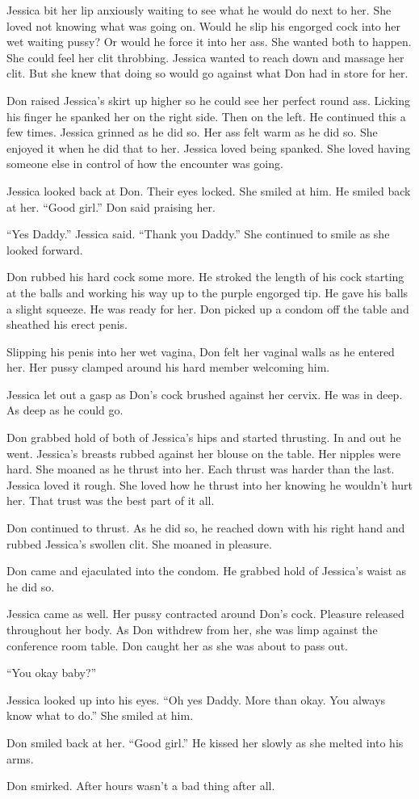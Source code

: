 Jessica bit her lip anxiously waiting to see what he would do next to her. She loved not knowing what was going on. Would he slip his engorged cock into her wet waiting pussy? Or would he force it into her ass. She wanted both to happen. She could feel her clit throbbing. Jessica wanted to reach down and massage her clit. But she knew that doing so would go against what Don had in store for her.

Don raised Jessica’s skirt up higher so he could see her perfect round ass. Licking his finger he spanked her on the right side. Then on the left. He continued this a few times. Jessica grinned as he did so. Her ass felt warm as he did so. She enjoyed it when he did that to her. Jessica loved being spanked. She loved having someone else in control of how the encounter was going.

Jessica looked back at Don. Their eyes locked. She smiled at him. He smiled back at her. “Good girl.” Don said praising her.

“Yes Daddy.” Jessica said. “Thank you Daddy.” She continued to smile as she looked forward.

Don rubbed his hard cock some more. He stroked the length of his cock starting at the balls and working his way up to the purple engorged tip. He gave his balls a slight squeeze. He was ready for her. Don picked up a condom off the table and sheathed his erect penis.

Slipping his penis into her wet vagina, Don felt her vaginal walls as he entered her. Her pussy clamped around his hard member welcoming him.

Jessica let out a gasp as Don’s cock brushed against her cervix. He was in deep. As deep as he could go.

Don grabbed hold of both of Jessica’s hips and started thrusting. In and out he went. Jessica's breasts rubbed against her blouse on the table. Her nipples were hard. She moaned as he thrust into her. Each thrust was harder than the last. Jessica loved it rough. She loved how he thrust into her knowing he wouldn’t hurt her. That trust was the best part of it all.

Don continued to thrust. As he did so, he reached down with his right hand and rubbed Jessica’s swollen clit. She moaned in pleasure.

Don came and ejaculated into the condom. He grabbed hold of Jessica’s waist as he did so.

Jessica came as well. Her pussy contracted around Don’s cock. Pleasure released throughout her body. As Don withdrew from her, she was limp against the conference room table. Don caught her as she was about to pass out.

“You okay baby?”

Jessica looked up into his eyes. “Oh yes Daddy. More than okay. You always know what to do.” She smiled at him.

Don smiled back at her. “Good girl.” He kissed her slowly as she melted into his arms.

Don smirked. After hours wasn’t a bad thing after all.

